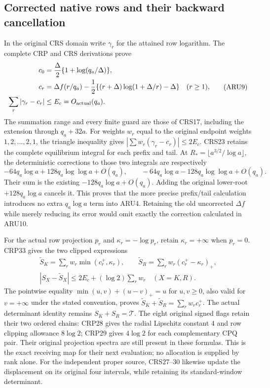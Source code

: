\documentclass[11pt,a4paper]{article}
\begin{document}
\subsection{Corrected native rows and their backward cancellation}
In the original CRS domain write $\gamma_r$ for the attained row
logarithm. The complete CRP and CRS derivations prove
\[
\begin{split}
 c_0&=\frac\Delta2\{1+\log(q_a/\Delta)\},\\
 c_r&=\Delta f(r/q_a)-\frac12
       \{(r+\Delta)\log(1+\Delta/r)-\Delta\}\quad(r\ge1),\\
 \sum_r|\gamma_r-c_r|&\le E_c=O_{\rm actual}(q_a).
\end{split}\tag{ARU9}
\]
The summation range and every finite guard are those of CRS17,
including the extension through $q_a+32a$. For weights $w_r$ equal
to the original endpoint weights $1,2,\ldots,2,1$, the triangle
inequality gives $|\sum w_r(\gamma_r-c_r)|\le2E_c$.
CRS23 retains the complete equilibrium integral for each prefix and
tail. At $R_*=\lfloor a^{3/2}/\log a\rfloor$, the deterministic
corrections to those two integrals are respectively
\[
 -64q_a\log a+128q_a\log\log a+O(q_a),\qquad
 -64q_a\log a-128q_a\log\log a+O(q_a).
 \tag{ARU10}
\]
Their sum is the existing $-128q_a\log a+O(q_a)$. Adding the
original lower-root $+128q_a\log a$ cancels it. This proves that the
more precise prefix/tail calculation introduces no extra
$q_a\log a$ term into ARU4. Retaining the old uncorrected
$\Delta f$ while merely reducing its error would omit exactly
the correction calculated in ARU10.

For the actual row projection $p_r$ and
$\kappa_r=-\log p_r$, retain $\kappa_r=+\infty$ when $p_r=0$.
CRP33 gives the two clipped expressions
\[
\begin{gathered}
 \widetilde S_K=\sum_r w_r\min(c_r^+,\kappa_r),\qquad
 \widetilde S_R=\sum_r w_r(c_r^+-\kappa_r)_+,\\
 |S_X-\widetilde S_X|\le2E_c+(\log2)\sum_r w_r\quad(X=K,R).
\end{gathered}
 \tag{ARU11}
\]
The pointwise equality
$\min(u,v)+(u-v)_+=u$ for $u,v\ge0$, also valid for $v=+\infty$
under the stated convention, proves
$\widetilde S_K+\widetilde S_R=\sum_rw_rc_r^+$.
The actual determinant identity remains $S_K+S_R=\mathcal T$.
The eight original signed flags retain their two ordered chains:
CRP28 gives the radial Lipschitz constant $4$ and row clipping
allowance $8\log2$; CRP29 gives $4\log2$ for each complementary
CPQ pair. Their original projection spectra are still present
in these formulas. This is the exact receiving map for their
next evaluation; no allocation is supplied by rank alone.
For the independent proper source, CRS27--30 likewise update
the displacement on its original four intervals, while retaining
its standard-window determinant.
\end{document}
